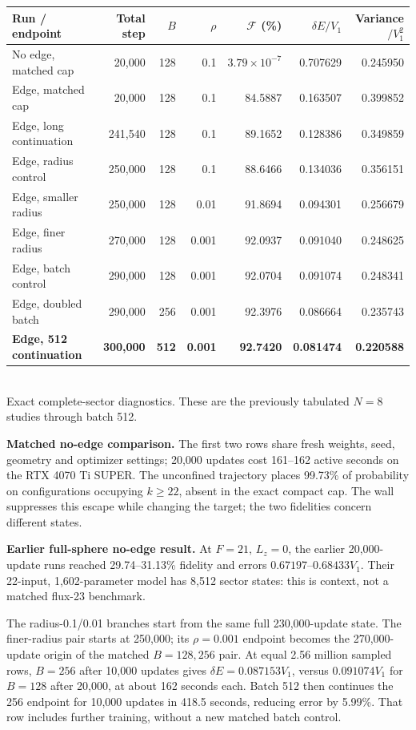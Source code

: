 \documentclass[10pt,letterpaper]{article}
\newcommand{\fid}{\mathcal F}
\newcommand{\de}{\delta E}
\newcommand{\V}{V_1}
\begin{document}
\begin{center}\small\setlength{\tabcolsep}{5pt}
\begin{tabular}{@{}lrrrrrr@{}}
\toprule
Run / endpoint & Total step & $B$ & $\rho$ & $\fid$ (\%) & $\de/\V$ & Variance$/\V^2$\\
\midrule
No edge, matched cap & 20,000 & 128 & 0.1 & $3.79\!\times\!10^{-7}$ & 0.707629 & 0.245950\\
Edge, matched cap & 20,000 & 128 & 0.1 & 84.5887 & 0.163507 & 0.399852\\
Edge, long continuation & 241,540 & 128 & 0.1 & 89.1652 & 0.128386 & 0.349859\\
Edge, radius control & 250,000 & 128 & 0.1 & 88.6466 & 0.134036 & 0.356151\\
Edge, smaller radius & 250,000 & 128 & 0.01 & 91.8694 & 0.094301 & 0.256679\\
Edge, finer radius & 270,000 & 128 & 0.001 & 92.0937 & 0.091040 & 0.248625\\
Edge, batch control & 290,000 & 128 & 0.001 & 92.0704 & 0.091074 & 0.248341\\
Edge, doubled batch & 290,000 & 256 & 0.001 & 92.3976 & 0.086664 & 0.235743\\
\textbf{Edge, 512 continuation} & \textbf{300,000} & \textbf{512} & \textbf{0.001} & \textbf{92.7420} & \textbf{0.081474} & \textbf{0.220588}\\
\bottomrule
\end{tabular}\\[3pt]
{\footnotesize Exact complete-sector diagnostics. These are the previously tabulated $N=8$ studies through batch 512.}
\end{center}

\textbf{Matched no-edge comparison.} The first two rows share fresh weights, seed, geometry and optimizer settings; 20,000 updates cost 161--162 active seconds on the RTX 4070 Ti SUPER. The unconfined trajectory places 99.73\% of probability on configurations occupying $k\ge22$, absent in the exact compact cap. The wall suppresses this escape while changing the target; the two fidelities concern different states.

\textbf{Earlier full-sphere no-edge result.} At $F=21$, $L_z=0$, the earlier 20,000-update runs reached 29.74--31.13\% fidelity and errors $0.67197$--$0.68433\V$. Their 22-input, 1,602-parameter model has 8,512 sector states: this is context, not a matched flux-23 benchmark.

The radius-0.1/0.01 branches start from the same full 230,000-update state. The finer-radius pair starts at 250,000; its $\rho=0.001$ endpoint becomes the 270,000-update origin of the matched $B=128,256$ pair. At equal 2.56 million sampled rows, $B=256$ after 10,000 updates gives $\de=0.087153\V$, versus $0.091074\V$ for $B=128$ after 20,000, at about 162 seconds each. Batch 512 then continues the 256 endpoint for 10,000 updates in 418.5 seconds, reducing error by 5.99\%. That row includes further training, without a new matched batch control.
\end{document}
